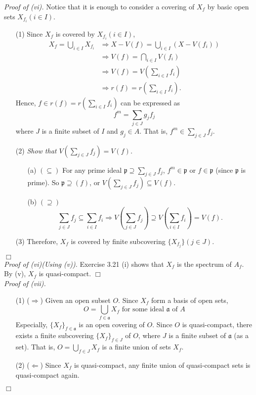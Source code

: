 \documentclass{article}
\begin{document}
\emph{Proof of (vi).}
Notice that it is enough to consider a covering of $X_f$
by basic open sets $X_{f_i} (i \in I)$.
\begin{enumerate}
\item[(1)]
Since $X_f$ is covered by $X_{f_i} (i \in I)$,
\begin{align*}
X_f = \bigcup_{i \in I} X_{f_i}
&\Longrightarrow X - V(f) = \bigcup_{i \in I} (X - V(f_i)) \\
&\Longrightarrow V(f) = \bigcap_{i \in I} V(f_i) \\
&\Longrightarrow V(f) = V\left( \sum_{i \in I} f_i \right) \\
&\Longrightarrow r(f) = r\left( \sum_{i \in I} f_i \right).
\end{align*}
Hence, $f \in r(f) = r\left( \sum_{i \in I} f_i \right)$ can be expressed as
$$f^m = \sum_{j \in J} g_j f_j$$
where $J$ is a finite subset of $I$ and $g_j \in A$.
That is, $f^m \in \sum_{j \in J} f_j$.
\item[(2)]
\emph{Show that $V\left( \sum_{j \in J} f_j \right) = V(f)$.}
\begin{enumerate}
  \item[(a)]
  $(\subseteq)$ For any prime ideal $\mathfrak{p} \supseteq \sum_{j \in J} f_j$,
  $f^m \in \mathfrak{p}$ or $f \in \mathfrak{p}$ (since $\mathfrak{p}$ is prime).
  So $\mathfrak{p} \supseteq (f)$,
  or $V\left( \sum_{j \in J} f_j \right) \subseteq V(f)$.
  \item[(b)]
  $(\supseteq)$
  $$\sum_{j \in J} f_j \subseteq \sum_{i \in I} f_i
  \Longrightarrow
  V\left( \sum_{j \in J} f_j \right) \supseteq V\left( \sum_{i \in I} f_i \right) = V(f).$$
\end{enumerate}
\item[(3)]
Therefore, $X_f$ is covered by finite subcovering $\{X_{f_j}\} (j \in J)$.
\end{enumerate}
$\Box$ \\



\emph{Proof of (vi)(Using (v)).}
Exercise 3.21 (i) shows that $X_f$ is the spectrum of $A_f$.
By (v), $X_f$ is quasi-compact.
$\Box$ \\



\emph{Proof of (vii).}
\begin{enumerate}
\item[(1)]
($\Longrightarrow$)
Given an open subset $O$.
Since $X_f$ form a basis of open sets,
$$O = \bigcup_{f \in \mathfrak{a}} X_f \text{ for some ideal $\mathfrak{a}$ of $A$}$$
Especially, $\{X_f\}_{f \in \mathfrak{a}}$ is an open covering of $O$.
Since $O$ is quasi-compact, there exists a finite subcovering $\{X_f\}_{f \in J}$ of $O$,
where $J$ is a finite subset of $\mathfrak{a}$ (as a set).
That is,
$O = \bigcup_{f \in J} X_f$ is a finite union of sets $X_f$.
\item[(2)]
($\Longleftarrow$)
Since $X_f$ is quasi-compact, any finite union of quasi-compact sets is quasi-compact again.
\end{enumerate}
$\Box$ \\\\
\end{document}
